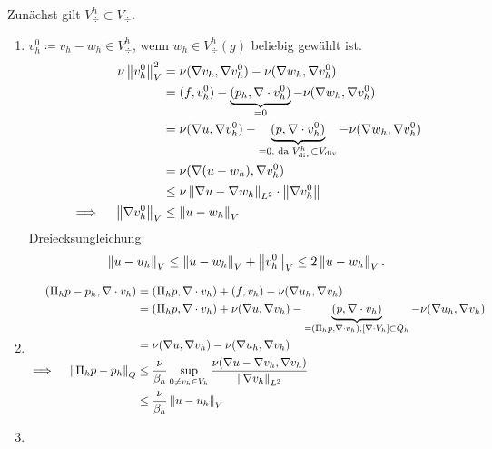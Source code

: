 \begin{beweis}
  Zunächst gilt $V_{\div}^{h} \subset V_{\div}$.
  \begin{enumerate}
  \item $v_{h}^{0}\coloneqq v_{h} - w_{h} \in V_{\div}^{h}$, wenn
    $w_{h} \in V_{\div}^{h}(g)$ beliebig gewählt ist.
    \begin{align*}
      \nu\left \|v^{0}_{h} \right\|_{V}^{2} &= \nu(\nabla v_{h}, \nabla v_{h}^{0}) - \nu(\nabla w_{h}, \nabla v_{h}^{0}) \\
      &= (f , v_{h}^{0})-\underbrace{(p_{h}, \nabla\cdot v_{h}^{0})}_{= 0}- \nu (\nabla w_{h}, \nabla v_{h}^{0})\\
      &= \nu(\nabla u, \nabla v_{h}^{0})-\underbrace{(p, \nabla\cdot v_{h}^{0})}_{= 0, \text{ da }V_{\operatorname{div}}^{h}\subset V_{\operatorname{div}}}- \nu (\nabla w_{h}, \nabla v_{h}^{0})\\
      &= \nu(\nabla( u - w_{h}), \nabla v_{h}^{0})\\
      &\leq \nu \left \| \nabla u - \nabla w_{h} \right\|_{L^{2}}\cdot\left \|\nabla v_{h}^{0} \right\|\\
      \implies \quad \left \|\nabla v_{h}^{0} \right\|_{V}&\leq \left \|u -
        w_{h} \right\|_{V}
    \end{align*}
    Dreiecksungleichung:
    \begin{align*}
      \left \|u - u_{h} \right\|_{V} \leq \left \|u - w_{h} \right\|_{V} +
      \left \|v_{h}^{0} \right\|_{V} \leq 2 \left \|u - w_{h} \right\|_{V}.
    \end{align*}
  \item
    \begin{align*}
      (\Pi_{h} p - p_{h}, \nabla\cdot v_{h}) &= (\Pi_{h}p, \nabla \cdot v_{h}) + (f,  v_{h}) - \nu(\nabla u_{h}, \nabla v_{h})\\
      &= (\Pi_{h}p, \nabla \cdot v_{h}) + \nu(\nabla u, \nabla v_{h}) -\underbrace{(p, \nabla\cdot v_{h})}_{= (\Pi_{h}p, \nabla\cdot v_{h}), [\nabla\cdot V_{h}] \subset Q_{h}}- \nu(\nabla u_{h}, \nabla v_{h})\\
      &= \nu(\nabla u, \nabla v_{h})- \nu(\nabla u_{h}, \nabla v_{h})\\
      \implies \quad \left \|\Pi_{h} p - p_{h} \right\|_{Q} &\leq \frac \nu {\beta_{h}} \sup_{0 \neq v_{h} \in V_{h}} \frac{\nu(\nabla u - \nabla v_{h}, \nabla v_{h})}{ \left \|\nabla v_{h} \right\|_{L^{2}}} \\
      & \leq \frac \nu {\beta_{h}}\left \|u-u_{h} \right\|_{V}
    \end{align*}
  \item
    \begin{align*}

\end{align*}
\end{enumerate}
\end{beweis}
